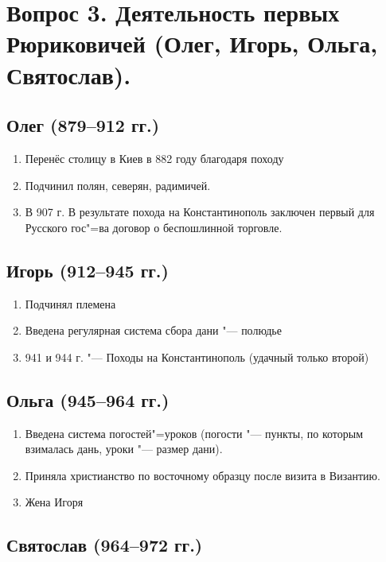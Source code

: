 \section{Вопрос 3. Деятельность первых Рюриковичей (Олег, Игорь, Ольга, Святослав).}

\subsection{Олег (879--912 гг.)}

\begin{enumerate}
    \item {Перенёс столицу в Киев в 882 году благодаря походу}
    \item {Подчинил полян, северян, радимичей.}
    \item {В 907 г. В результате похода на Константинополь заключен первый для Русского гос"=ва договор о беспошлинной торговле.}
\end{enumerate}

\subsection{Игорь (912--945 гг.)}

\begin{enumerate}
    \item{Подчинял племена}
    \item{Введена регулярная система сбора дани "--- полюдье}
    \item{941 и 944 г. "--- Походы на Константинополь (удачный только второй)}
\end{enumerate}

\subsection{Ольга (945--964 гг.)}

\begin{enumerate}
    \item{ Введена система погостей"=уроков (погости "--- пункты, по которым взималась дань, уроки "--- размер дани).}
    \item{ Приняла христианство по восточному образцу после визита в Византию.}
    \item{ Жена Игоря}
\end{enumerate}

\subsection{Святослав (964--972 гг.)}

